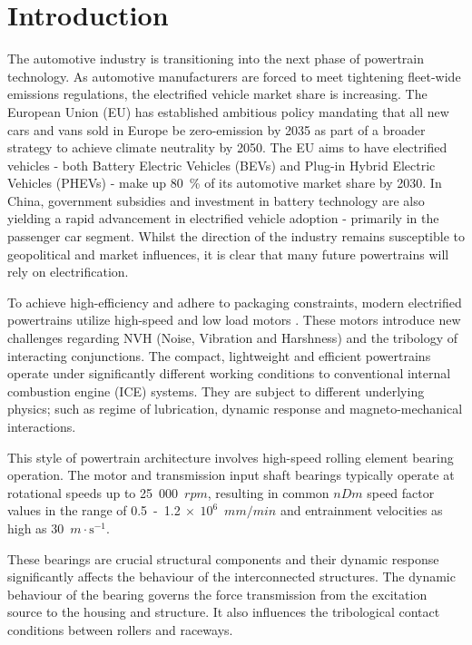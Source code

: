 \chapter{Introduction} \label{Introduction}

The automotive industry is transitioning into the next phase of powertrain technology. As automotive manufacturers are forced to meet tightening fleet-wide emissions regulations, the electrified vehicle market share is increasing. The European Union (EU) has established ambitious policy \cite{EUL110/5} mandating that all new cars and vans sold in Europe be zero-emission by 2035 as part of a broader strategy to achieve climate neutrality by 2050. The EU aims to have electrified vehicles - both Battery Electric Vehicles (BEVs) and Plug-in Hybrid Electric Vehicles (PHEVs) - make up 80~\% of its automotive market share by 2030. In China, government subsidies and investment in battery technology are also yielding a rapid advancement in electrified vehicle adoption - primarily in the passenger car segment. Whilst the direction of the industry remains susceptible to geopolitical and market influences, it is clear that many future powertrains will rely on electrification.

To achieve high-efficiency and adhere to packaging constraints, modern electrified powertrains utilize high-speed and low load motors \cite{Cai2021}. These motors introduce new challenges regarding NVH (Noise, Vibration and Harshness) and the tribology of interacting conjunctions. The compact, lightweight and efficient powertrains operate under significantly different working conditions to conventional internal combustion engine (ICE) systems. They are subject to different underlying physics; such as regime of lubrication, dynamic response and magneto-mechanical interactions.

This style of powertrain architecture involves high-speed rolling element bearing operation. The motor and transmission input shaft bearings typically operate at rotational speeds up to 25~000~$rpm$, resulting in common $nDm$ speed factor values in the range of 0.5~-~1.2$~\times~10^6$~$mm/min$ and entrainment velocities as high as 30~$m \cdot \mathrm{s}^{-1}$.

These bearings are crucial structural components and their dynamic response significantly affects the behaviour of the interconnected structures. The dynamic behaviour of the bearing governs the force transmission from the excitation source to the housing and structure. It also influences the tribological contact conditions between rollers and raceways.

